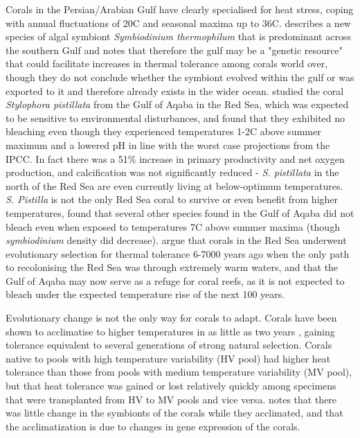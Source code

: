 \documentclass[11pt,a4paper]{article}
\begin{document}
Corals in the Persian/Arabian Gulf have clearly specialised for heat stress, coping with annual fluctuations of 20\textdegree C and seasonal maxima up to 36\textdegree C.
 \cite{Hume2015} describes a new species of algal symbiont \textit{Symbiodinium thermophilum} that is predominant across the southern Gulf and notes that therefore the gulf may be a "genetic resource" that could facilitate increases in thermal tolerance among corals world over, though they do not conclude whether the symbiont evolved within the gulf or was exported to it and therefore already exists in the wider ocean.
 \cite{Krueger2017} studied the coral \textit{Stylophora pistillata} from the Gulf of Aqaba in the Red Sea, which was expected to be sensitive to environmental disturbances, and found that they exhibited no bleaching even though they experienced temperatures 1-2\textdegree C above summer maximum and a lowered pH in line with the worst case projections from the IPCC.
 In fact there was a 51\% increase in primary productivity and net oxygen production, and calcification was not significantly reduced - \textit{S. pistillata} in the north of the Red Sea are even currently living at below-optimum temperatures.
 \textit{S. Pistilla} is not the only Red Sea coral to survive or even benefit from higher temperatures, \cite{Fine2013} found that several other species found in the Gulf of Aqaba did not bleach even when exposed to temperatures 7\textdegree C above summer maxima (though \textit{symbiodinium} density did decrease).
 \cite{Fine2013} argue that corals in the Red Sea underwent evolutionary selection for thermal tolerance 6-7000 years ago when the only path to recolonising the Red Sea was through extremely warm waters, and that the Gulf of Aqaba may now serve as a refuge for coral reefs, as it is not expected to bleach under the expected temperature rise of the next 100 years. 


Evolutionary change is not the only way for corals to adapt.
 Corals have been shown to acclimatise to higher temperatures in as little as two years \citep{Palumbi2014}, gaining tolerance equivalent to several generations of strong natural selection.
 Corals native to pools with high temperature variability (HV pool) had higher heat tolerance than those from pools with medium temperature variability (MV pool), but that heat tolerance was gained or lost relatively quickly among specimens that were transplanted from HV to MV pools and vice versa.
 \cite{Palumbi2014} notes that there was little change in the symbionts of the corals while they acclimated, and that the acclimatization is due to changes in gene expression of the corals. 
\end{document}
